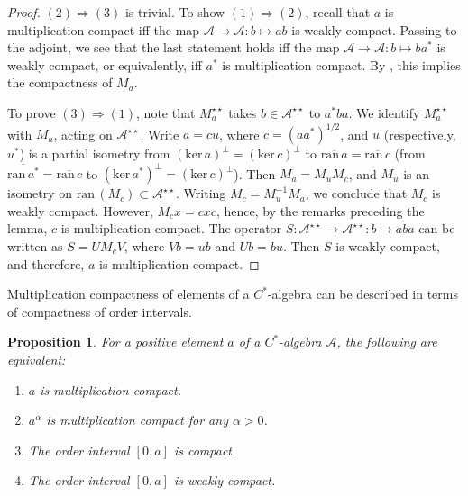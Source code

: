 \documentclass[12pt]{amsart}
\theoremstyle{plain}
\newtheorem{proposition}[theorem]{Proposition}
\theoremstyle{definition}
\renewcommand{\leq}{\leqslant}
\newcommand{\A}{\mathcal{A}}
\def \ker{{\mathrm{ker}} \, }
\def \ran{{\mathrm{ran}} \, }
\begin{document}
\begin{proof}
$(2) \Rightarrow (3)$ is trivial. To show $(1) \Rightarrow (2)$,
recall that $a$ is multiplication compact iff the map
$\A \to \A : b \mapsto ab$ is weakly compact. Passing to the
adjoint, we see that the last statement holds iff the map
$\A \to \A : b \mapsto ba^*$ is weakly compact, or equivalently,
iff $a^*$ is multiplication compact. By \cite{BT}, this implies
the compactness of $M_a$.

To prove $(3) \Rightarrow (1)$, note that %
$M_a^{\star\star}$ takes $b \in \A^{\star\star}$ to $a^* b a$.
We identify
$M_a^{\star\star}$ with $M_a$, acting on $\A^{\star\star}$. Write
$a = c u$, where $c = (a a^*)^{1/2}$, and $u$ (respectively, $u^*$)
is a partial isometry from $(\ker a)^\perp = (\ker c)^\perp$ to
$\overline{\ran a} = \overline{\ran c}$ (from 
$\overline{\ran a^*} = \overline{\ran c}$ to
$(\ker a^*)^\perp = (\ker c)^\perp$).
Then $M_a = M_u M_c$, and $M_u$ is an isometry on
$\ran(M_c) \subset \A^{\star\star}$. Writing $M_c = M_u^{-1} M_a$,
we conclude that $M_c$ is weakly compact. However,
$M_c x = cxc$, hence, by the remarks preceding the lemma,
$c$ is multiplication compact.
The operator $S : \A^{\star\star} \to \A^{\star\star} : b \mapsto a b a$ can
be written as $S = U M_c V$, where $V b = u b$ and $U b = b u$.
Then $S$ is weakly compact, and therefore, $a$ is multiplication compact.
\end{proof}

Multiplication compactness of elements of a $C^*$-algebra can be described in
terms of compactness of order intervals.

\begin{proposition}\label{prop:comp_int}
For a positive element $a$ of a $C^*$-algebra $\A$, the following are
equivalent:
\begin{enumerate}
\item
$a$ is multiplication compact.
\item
$a^\alpha$ is multiplication compact for any $\alpha > 0$.
\item
The order interval $[0,a]$ %
is compact.
\item
The order interval $[0,a]$ %
is weakly compact.
\end{enumerate}
\end{proposition}
\end{document}
